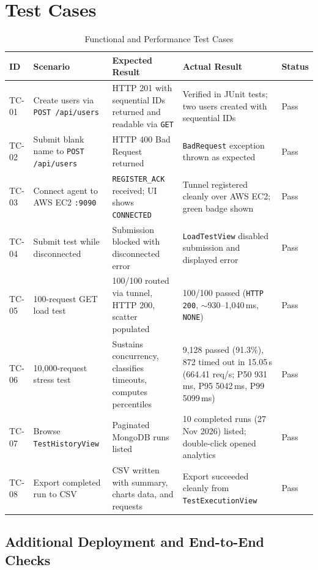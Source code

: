 \documentclass[11pt,a4paper]{report}
\begin{document}
\section{Test Cases}

\begin{table}[!htbp]
\centering
\footnotesize
\caption{Functional and Performance Test Cases}
\label{tab:testcases}
\begin{tabularx}{\linewidth}{|L{1.1cm}|L{2.7cm}|Y|Y|L{1.1cm}|}
\hline
\textbf{ID} & \textbf{Scenario} & \textbf{Expected Result} & \textbf{Actual Result} & \textbf{Status} \\
\hline
TC-01 & Create users via \texttt{POST /api/users} & HTTP 201 with sequential IDs returned and readable via \texttt{GET} & Verified in JUnit tests; two users created with sequential IDs & Pass \\
\hline
TC-02 & Submit blank name to \texttt{POST /api/users} & HTTP 400 Bad Request returned & \texttt{BadRequest} exception thrown as expected & Pass \\
\hline
TC-03 & Connect agent to AWS EC2 \texttt{:9090} & \texttt{REGISTER\_ACK} received; UI shows \texttt{CONNECTED} & Tunnel registered cleanly over AWS EC2; green badge shown & Pass \\
\hline
TC-04 & Submit test while disconnected & Submission blocked with disconnected error & \texttt{LoadTestView} disabled submission and displayed error & Pass \\
\hline
TC-05 & 100-request GET load test & 100/100 routed via tunnel, HTTP 200, scatter populated & 100/100 passed (\texttt{HTTP 200}, $\sim$930--1,040\,ms, \texttt{NONE}) & Pass \\
\hline
TC-06 & 10,000-request stress test & Sustains concurrency, classifies timeouts, computes percentiles & 9,128 passed (91.3\%), 872 timed out in 15.05\,s (664.41 req/s; P50 931\,ms, P95 5042\,ms, P99 5099\,ms) & Pass \\
\hline
TC-07 & Browse \texttt{TestHistoryView} & Paginated MongoDB runs listed & 10 completed runs (27 Nov 2026) listed; double-click opened analytics & Pass \\
\hline
TC-08 & Export completed run to CSV & CSV written with summary, charts data, and requests & Export succeeded cleanly from \texttt{TestExecutionView} & Pass \\
\hline
\end{tabularx}
\end{table}

\subsection{Additional Deployment and End-to-End Checks}
\end{document}
